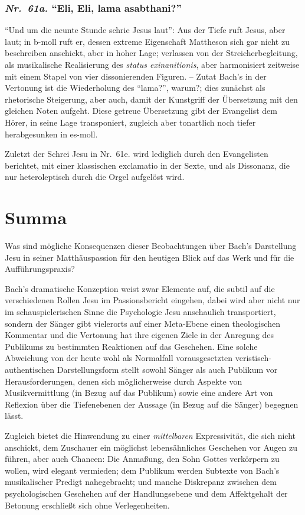 \documentclass[a4paper,11pt,twoside]{scrartcl}
\newcommand{\Nr}[1]{\textmd{\textit{Nr.~#1}}}
\begin{document}
\subsubsection*{\Nr{61a.} \enquote{Eli, Eli, lama asabthani?}}
\enquote{Und um die neunte Stunde schrie Jesus laut}: Aus der Tiefe
ruft Jesus, aber laut; in b-moll ruft er, dessen extreme Eigenschaft
Mattheson sich gar nicht zu beschreiben anschickt, aber in hoher Lage;
verlassen von der Streicherbegleitung, als musikalische Realisierung
des \textit{status exinanitionis}, aber harmonisiert zeitweise mit
einem Stapel von vier dissonierenden Figuren. – Zutat Bach’s in der
Vertonung ist die Wiederholung des \enquote{lama?}, warum?; dies
zunächst als rhetorische Steigerung, aber auch, damit der Kunstgriff
der Übersetzung mit den gleichen Noten aufgeht.  Diese getreue
Übersetzung gibt der Evangelist dem Hörer, in seine Lage transponiert,
zugleich aber tonartlich noch tiefer herabgesunken in es-moll.

Zuletzt der Schrei Jesu in Nr.~61e. wird lediglich durch den Evangelisten
berichtet, mit einer klassischen exclamatio in der Sexte, und als
Dissonanz, die nur heteroleptisch durch die Orgel aufgelöst wird.

\section{Summa}

Was sind mögliche Konsequenzen dieser Beobachtungen über Bach’s Darstellung
Jesu in seiner Matthäuspassion für den heutigen Blick auf das Werk und
für die Aufführungspraxis?

Bach’s dramatische Konzeption weist zwar Elemente auf, die subtil auf
die verschiedenen Rollen Jesu im Passionsbericht eingehen, dabei wird
aber nicht nur im schauspielerischen Sinne die Psychologie Jesu anschaulich
transportiert, sondern der Sänger gibt vielerorts auf einer Meta-Ebene einen
theologischen Kommentar und die Vertonung hat ihre eigenen Ziele in der
Anregung des Publikums zu bestimmten Reaktionen auf das Geschehen.  Eine
solche Abweichung von der heute wohl als Normalfall vorausgesetzten
veristisch-authentischen Darstellungsform stellt sowohl Sänger als auch
Publikum vor Herausforderungen, denen sich möglicherweise durch Aspekte von
Musikvermittlung (in Bezug auf das Publikum) sowie eine andere Art von
Reflexion über die Tiefenebenen der Aussage (in Bezug auf die Sänger)
begegnen lässt.

Zugleich bietet die Hinwendung zu einer \emph{mittelbaren} Expressivität,
die sich nicht anschickt, dem Zuschauer ein möglichst lebensähnliches
Geschehen vor Augen zu führen, aber auch Chancen: Die Anmaßung, den Sohn
Gottes verkörpern zu wollen, wird elegant vermieden; dem Publikum werden
Subtexte von Bach’s musikalischer Predigt nahegebracht; und manche Diskrepanz
zwischen dem psychologischen Geschehen auf der Handlungsebene und dem
Affektgehalt der Betonung erschließt sich ohne Verlegenheiten.
\end{document}
